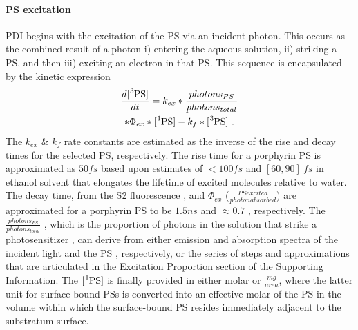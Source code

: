 \paragraph{PS excitation}
PDI begins with the excitation of the PS via an incident photon. This occurs as the combined result of a photon i) entering the aqueous solution, ii) striking a PS, and then iii) exciting an electron in that PS. This sequence is encapsulated by the kinetic expression
\begin{multline} \label{ps_excitation_kinetics}
    \frac{d[\ce{^3PS}]}{dt} =  k_{ex}*\frac{photons_{PS}}{photons_{total}} \\ 
    *\Phi_{ex}*[\ce{^1PS}] - k_{f}*[\ce{^3PS}]~. 
\end{multline}
The $k_{ex}$ \& $k_{f}$ rate constants are estimated as the inverse of the rise and decay times for the selected PS, respectively. The rise time for a porphyrin PS is approximated as $50 fs$ based upon estimates of $<100 fs$ \cite{Andersson1999PhotoinducedState} and $[60,90]~ fs$ in ethanol solvent \cite{Gurzadyan1998Time-resolvedZn-tetraphenylporphyrin} that elongates the lifetime of excited molecules relative to water. The decay time, from the S2 fluorescence \cite{Akimoto1999UltrafastPorphyrins}, and $\Phi_{ex}$ ($\frac{PS excited}{photon absorbed}$) are approximated for a porphyrin PS to be $1.5 ns$ and $\approx 0.7$ \cite{Krasnovsky2012PhotochemicalEnvironment}, respectively. The $\frac{photons_{PS}}{photons_{total}}$ \cite{Brasel2020AnAgalactiae}, which is the proportion of photons in the solution that strike a photosensitizer \cite{Santos2020ApplicationAureus}, can derive from either emission and absorption spectra of the incident light and the PS \cite{Gerola2012ChemicalPhotobleaching}, respectively, or the series of steps and approximations that are articulated in the Excitation Proportion section of the Supporting Information. The $[\ce{^1PS}]$ is finally provided in either molar or $\frac{mg}{area}$, where the latter unit for surface-bound PSs is converted into an effective molar of the PS in the volume within which the surface-bound PS resides immediately adjacent to the substratum surface. 


